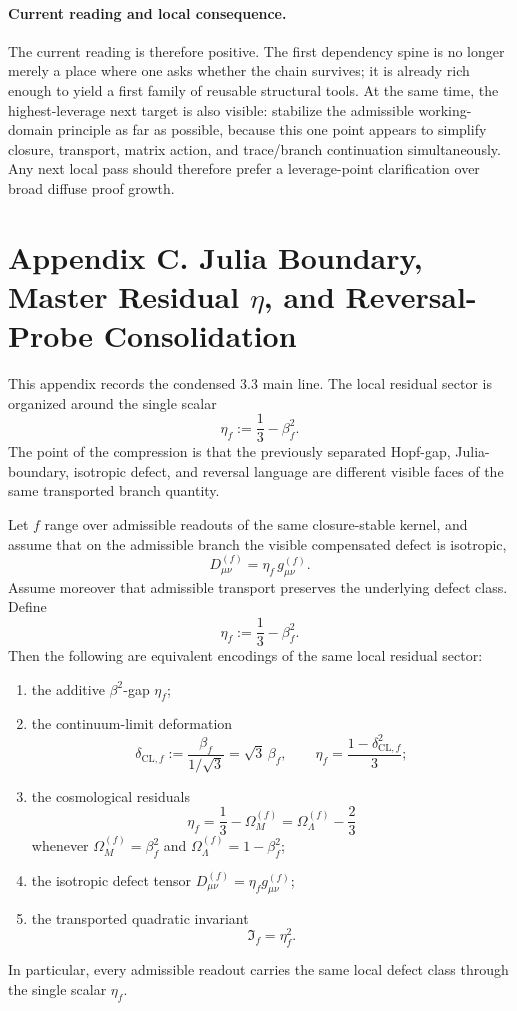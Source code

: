 \paragraph{Current reading and local consequence.}
The current reading is therefore positive. The first dependency spine is no longer merely a place where one asks whether the chain survives; it is already rich enough to yield a first family of reusable structural tools. At the same time, the highest-leverage next target is also visible: stabilize the admissible working-domain principle as far as possible, because this one point appears to simplify closure, transport, matrix action, and trace/branch continuation simultaneously. Any next local pass should therefore prefer a leverage-point clarification over broad diffuse proof growth.



\section*{Appendix C. Julia Boundary, Master Residual $\eta$, and Reversal-Probe Consolidation}

This appendix records the condensed 3.3 main line. The local residual sector is organized around the single scalar
\[
  \eta_f:=\frac13-\beta_f^2.
\]
The point of the compression is that the previously separated Hopf-gap, Julia-boundary, isotropic defect, and reversal language are different visible faces of the same transported branch quantity.

\begin{proposition}
\label{lem:defect-transport}
\label{prop:master-defect-scalar}
Let $f$ range over admissible readouts of the same closure-stable kernel, and assume that on the admissible branch the visible compensated defect is isotropic,
\[
  D^{(f)}_{\mu\nu}=\eta_f\,g^{(f)}_{\mu\nu}.
\]
Assume moreover that admissible transport preserves the underlying defect class. Define
\[
  \eta_f:=\frac13-\beta_f^2.
\]
Then the following are equivalent encodings of the same local residual sector:
\begin{enumerate}[label=(\roman*)]
  \item the additive $\beta^2$-gap $\eta_f$;
  \item the continuum-limit deformation
  \[
    \delta_{\mathrm{CL},f}:=\frac{\beta_f}{1/\sqrt3}=\sqrt3\,\beta_f,
    \qquad
    \eta_f=\frac{1-\delta_{\mathrm{CL},f}^2}{3};
  \]
  \item the cosmological residuals
  \[
    \eta_f=\frac13-\Omega_M^{(f)}=\Omega_\Lambda^{(f)}-\frac23
  \]
  whenever $\Omega_M^{(f)}=\beta_f^2$ and $\Omega_\Lambda^{(f)}=1-\beta_f^2$;
  \item the isotropic defect tensor $D^{(f)}_{\mu\nu}=\eta_f g^{(f)}_{\mu\nu}$;
  \item the transported quadratic invariant
  \[
    \mathfrak I_f=\eta_f^2.
  \]
\end{enumerate}
In particular, every admissible readout carries the same local defect class through the single scalar $\eta_f$.
\end{proposition}

